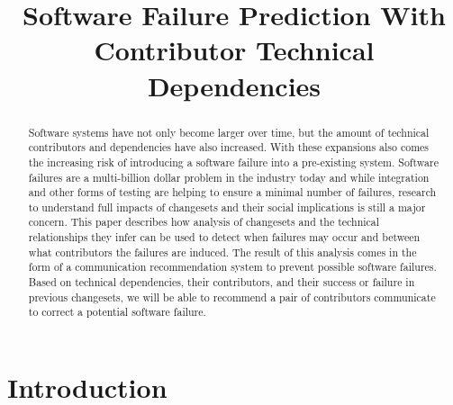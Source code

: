 \documentclass[conference]{IEEEtran}
\begin{document}
\title{Software Failure Prediction With Contributor Technical Dependencies}

\author{
\and
{}
\and
{}
}

\maketitle


\begin{abstract}
Software systems have not only become larger over time, but the amount of
technical contributors and dependencies have also increased. With these expansions also comes
the increasing risk of introducing a software failure into a pre-existing system.
Software failures are a multi-billion dollar problem in the industry today and while integration and
other forms of testing are helping to ensure a minimal number of failures, research to understand
full impacts of changesets and their social implications is still a major concern. This paper describes
how analysis of changesets and the technical relationships they infer can be used to detect when failures 
may occur and between what contributors the failures are induced. The result of this
analysis comes in the form of a communication recommendation system to prevent possible software 
failures. Based on technical dependencies, their contributors, and their 
success or failure in previous changesets,  we will be able to recommend a pair of contributors
communicate to correct a potential software failure.
\end{abstract}


\section{Introduction}
\end{document}
